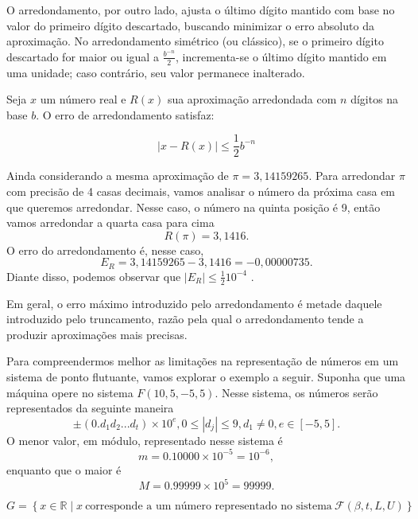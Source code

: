 O arredondamento, por outro lado, ajusta o último dígito mantido com base no valor do primeiro dígito descartado, buscando minimizar o erro absoluto da aproximação. No arredondamento simétrico (ou clássico), se o primeiro dígito descartado for maior ou igual a \( \frac{b^{-n}}{2} \), incrementa-se o último dígito mantido em uma unidade; caso contrário, seu valor permanece inalterado.

Seja \( x \) um número real e \( R(x) \) sua aproximação arredondada com \( n \) dígitos na base \( b \). O erro de arredondamento satisfaz:

\[
|x - R(x)| \leq \frac{1}{2} b^{-n}
\]

\begin{ex}
Ainda considerando a mesma aproximação de \(\pi = 3,14159265\).
Para arredondar $\pi$  com precisão de 4 casas decimais, vamos analisar o número da próxima casa em que queremos arredondar. Nesse caso, o número na quinta posição é 9, então vamos arredondar a quarta casa para cima 
$$R(\pi) = 3,1416.$$
O erro do arredondamento é, nesse caso, $$E_R = 3,14159265 - 3,1416  = -0,00000735.$$  
Diante disso, podemos observar que $|E_R| \leq  \frac{ 1}{2}10^{-4}$ . %
\end{ex}

Em geral, o erro máximo introduzido pelo arredondamento é metade daquele introduzido pelo truncamento, razão pela qual o arredondamento tende a produzir aproximações mais precisas.




Para compreendermos melhor as limitações na representação de números em um sistema de ponto flutuante, vamos explorar o exemplo a seguir. Suponha que uma máquina opere no sistema $F(10, 5, -5, 5)$. %
Nesse sistema, os números serão representados da seguinte maneira
\begin{equation}
\pm (0.d_{1}d_{2} . . . d_{t}) \times 10^e,  0 \leq |d_{j}| \leq 9,  d_{1} \neq 0, e \in [-5,5].
\end{equation}
O menor valor, em módulo, representado nesse sistema é
$$
m = 0.10000 \times 10^{-5} = 10^{-6},
$$
enquanto que o maior é
$$
M = 0.99999 \times 10^{5} = 99999.
$$

\[
G = \left\{ x \in \mathbb{R} \mid x\ \text{corresponde a um número representado no sistema}\ \mathcal{F}(\beta,t,L,U) \right\}
\]

